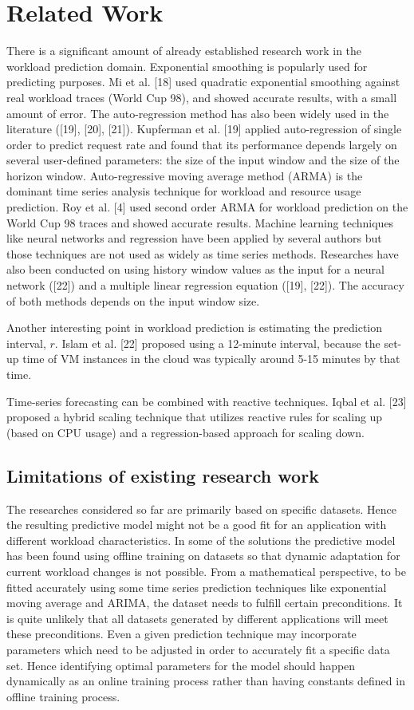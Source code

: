 \section{Related Work}

There is a significant amount of already established research work in the workload prediction domain. Exponential smoothing is popularly used for predicting purposes. Mi et al. [18] used quadratic exponential smoothing against real workload traces (World Cup 98), and showed accurate results, with a small amount of error. The auto-regression method has also been widely used in the literature ([19], [20], [21]). Kupferman et al. [19] applied auto-regression of single order to predict request rate and found that its performance depends largely on several user-defined parameters: the size of the input window and the size of the horizon window. Auto-regressive moving average method (ARMA) is the dominant time series analysis technique for workload and resource usage prediction. Roy et al. [4] used second order ARMA for workload prediction on the World Cup 98 traces and showed accurate results. Machine learning techniques like neural networks and regression have been applied by several authors but those techniques are not used as widely as time series methods. Researches have also been conducted on using history window values as the input for a neural network ([22]) and a multiple linear regression equation ([19], [22]). The accuracy of both methods depends on the input window size.

Another interesting point in workload prediction is estimating the prediction interval, $r$. Islam et al. [22] proposed using a 12-minute interval, because the set-up time of VM instances in the cloud was typically around 5-15 minutes by that time.

Time-series forecasting can be combined with reactive techniques. Iqbal et al. [23] proposed a hybrid scaling technique that utilizes reactive rules for scaling up (based on CPU usage) and a regression-based approach for scaling down.

\subsection{Limitations of existing research work}

The researches considered so far are primarily based on specific datasets. Hence the resulting predictive model might not be a good fit for an application with different workload characteristics. In some of the solutions the predictive model has been found using offline training on datasets so that dynamic adaptation for current workload changes is not possible. 
From a mathematical perspective, to be fitted accurately using some time series prediction techniques like exponential moving average and ARIMA, the dataset needs to fulfill certain preconditions. It is quite unlikely that all datasets generated by different applications will meet these preconditions. Even a given prediction technique may incorporate parameters which need to be adjusted in order to accurately fit a specific data set. Hence identifying optimal parameters for the model should happen dynamically as an online training process rather than having constants defined in offline training process.
